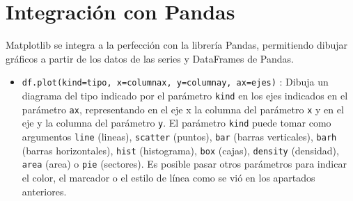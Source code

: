 \documentclass[
  spanish,
  a4paper,
]{scrreport}
\providecommand{\tightlist}{%
  \setlength{\itemsep}{0pt}\setlength{\parskip}{0pt}}
\begin{document}
\section{Integración con Pandas}\label{integraciuxf3n-con-pandas}

Matplotlib se integra a la perfección con la librería Pandas,
permitiendo dibujar gráficos a partir de los datos de las series y
DataFrames de Pandas.

\begin{itemize}
\tightlist
\item
  \texttt{df.plot(kind=tipo,\ x=columnax,\ y=columnay,\ ax=ejes)} :
  Dibuja un diagrama del tipo indicado por el parámetro \texttt{kind} en
  los ejes indicados en el parámetro \texttt{ax}, representando en el
  eje x la columna del parámetro \texttt{x} y en el eje y la columna del
  parámetro \texttt{y}. El parámetro \texttt{kind} puede tomar como
  argumentos \texttt{\textquotesingle{}line\textquotesingle{}} (lineas),
  \texttt{\textquotesingle{}scatter\textquotesingle{}} (puntos),
  \texttt{\textquotesingle{}bar\textquotesingle{}} (barras verticales),
  \texttt{\textquotesingle{}barh\textquotesingle{}} (barras
  horizontales), \texttt{\textquotesingle{}hist\textquotesingle{}}
  (histograma), \texttt{\textquotesingle{}box\textquotesingle{}}
  (cajas), \texttt{\textquotesingle{}density\textquotesingle{}}
  (densidad), \texttt{\textquotesingle{}area\textquotesingle{}} (area) o
  \texttt{\textquotesingle{}pie\textquotesingle{}} (sectores). Es
  posible pasar otros parámetros para indicar el color, el marcador o el
  estilo de línea como se vió en los apartados anteriores.
\end{itemize}
\end{document}
